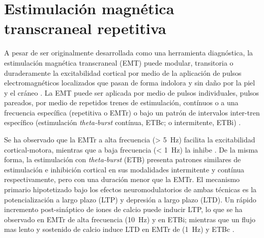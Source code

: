 \section{Estimulación magnética transcraneal repetitiva}
A pesar de ser originalmente desarrollada como una herramienta diagnóstica, la estimulación magnética transcraneal (EMT) puede modular, transitoria o duraderamente la excitabilidad cortical por medio de la aplicación de pulsos electromagnéticos localizados que pasan de forma indolora y sin daño por la piel y el cráneo \parencite{Horvath2011a, Noohi2016}.
La EMT puede ser aplicada por medio de pulsos individuales, pulsos pareados, por medio de repetidos trenes de estimulación, contínuos o a una frecuencia específica (repetitiva o EMTr) o bajo un patrón de intervalos inter-tren específico (estimulación \textit{theta-burst} contínua, ETBc; o intermitente, ETBi) \parencite{Ekhtiari2019}. \par
Se ha observado que la EMTr a alta frecuencia (\deactivatequoting\SI{> 5}{\hertz}\activatequoting) facilita la excitabilidad cortical-motora, mientras que a baja frecuencia (\deactivatequoting\SI{< 1}{\hertz}\activatequoting) la inhibe \parencite{Pascual-Leone1994}.
De la misma forma, la estimulación con \textit{theta-burst} (ETB) presenta patrones similares de estimulación e inhibición cortical en sus modalidades intermitente y contínua respectivamente, pero con una duración menor que la EMTr. El mecanismo primario hipotetizado bajo los efectos neuromodulatorios de ambas técnicas es la potencialización a largo plazo (LTP) y depresión a largo plazo (LTD).
Un rápido incremento post-sináptico de iones de calcio puede inducir LTP, lo que se ha observado en EMTr de alta frecuencia (\SI{10}{\hertz}) y en ETBi; mientras que un flujo mas lento y sostenido de calcio induce LTD en EMTr de (\SI{1}{\hertz}) y ETBc \parencite{Ekhtiari2019}.


